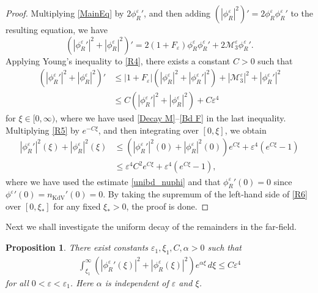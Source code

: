 \documentclass{amsart}
\newcommand{\veps}{\varepsilon}
\numberwithin{equation}{section}
\theoremstyle{plain}%
\newtheorem{proposition}[theorem]{Proposition}
\theoremstyle{definition}
\theoremstyle{remark}
\theoremstyle{remark}
\begin{document}
\begin{proof}
Multiplying \eqref{MainEq} by $2{\phi_R^\veps}'$, and then adding $(|\phi_R^\veps|^2)' = 2\phi_R^\veps{\phi_R^\veps}'$ to the resulting equation, we have
\begin{equation}\label{R4}
\left( |{\phi_R^\veps}'|^2 + |\phi_R^\veps|^2 \right)' =  2(1+F_\veps) \phi_R^\veps{\phi_R^\veps}' + 2\mathcal{M}_3^\veps{\phi_R^\veps}'.
\end{equation}
Applying Young's inequality to \eqref{R4}, there exists a constant $C>0$ such that 
\begin{equation}\label{R5}
\begin{split}
\left( |{\phi_R^\veps}'|^2 + |\phi_R^\veps|^2 \right)' 
& \leq   |1+F_\veps|\left(|\phi_R^\veps|^2 +|{\phi_R^\veps}'|^2 \right) +  |\mathcal{M}_3^\veps|^2 +  |{\phi_R^\veps}'|^2 \\
& \leq C\left( |{\phi_R^\veps}'|^2 + |\phi_R^\veps|^2 \right) + C\veps^4
\end{split}
\end{equation}
for $\xi \in [0,\infty)$, where we have used \eqref{Decay M}--\eqref{Bd F} in the last inequality. Multiplying \eqref{R5} by $e^{-C\xi}$, and then integrating over $[0,\xi]$, we obtain
\begin{equation}\label{R6}
\begin{split}
|{\phi_R^\veps}'|^2(\xi) +|\phi_R^\veps|^2(\xi)
& \leq  \left( |{\phi_R^\veps}'|^2(0)  +|\phi_R^\veps|^2(0) \right) e^{C\xi} + \veps^4(e^{C\xi}-1) \\
& \leq \veps^4C^2e^{C\xi} +  \veps^4(e^{C\xi}-1),
\end{split}
\end{equation}
where we have used the estimate \eqref{unibd_nuphi} and that ${\phi_R^\veps}'(0)=0$ since ${\phi^\veps}'(0)=n_{\text{KdV}}'(0) = 0$. By taking the supremum of the left-hand side of \eqref{R6} over $[0,\xi_\ast]$ for any fixed $\xi_\ast>0$, the proof is done.
\end{proof}
Next we shall investigate the uniform decay of the remainders in the far-field.
\begin{proposition}\label{Prop3}
There exist constants $\veps_1,\xi_1,C,\alpha>0$ such that
\begin{equation}\label{EqProp3}
\begin{split}
\int_{\xi_1}^\infty\left( |{\phi_R^\veps}' (\xi) |^2 + | \phi_R^\veps(\xi)|^2 \right)e^{\alpha\xi}\, d\xi \leq  C\veps^4
\end{split}
\end{equation}
for all $0<\veps<\veps_1$. Here $\alpha$ is independent of $\veps$ and $\xi$.
\end{proposition}
\end{document}
